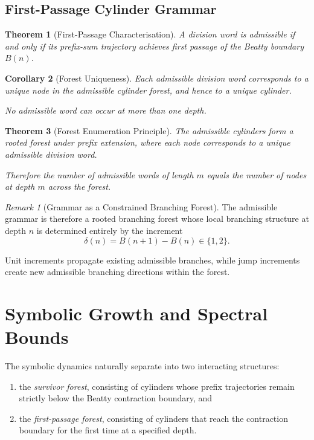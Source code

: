 \documentclass[12pt, oneside]{article}
\numberwithin{equation}{section}
\theoremstyle{definition}
\theoremstyle{plain}
\newtheorem{theorem}{Theorem}[section]
\newtheorem{corollary}[theorem]{Corollary}
\theoremstyle{remark}
\newtheorem*{remark}{Remark}
\begin{document}
\subsection{First-Passage Cylinder Grammar}

\begin{theorem}[First-Passage Characterisation]
A division word is admissible if and only if its prefix-sum trajectory
achieves first passage of the Beatty boundary \(B(n)\).
\end{theorem}

\begin{corollary}[Forest Uniqueness]
Each admissible division word corresponds to a unique node in the
admissible cylinder forest, and hence to a unique cylinder.

No admissible word can occur at more than one depth.
\end{corollary}

\begin{theorem}[Forest Enumeration Principle]
The admissible cylinders form a rooted forest under prefix extension,
where each node corresponds to a unique admissible division word.

Therefore the number of admissible words of length \(m\) equals the
number of nodes at depth \(m\) across the forest.
\end{theorem}

\begin{remark}[Grammar as a Constrained Branching Forest]
The admissible grammar is therefore a rooted branching forest whose
local branching structure at depth \(n\) is determined entirely by the
increment
\[
\delta(n)=B(n+1)-B(n)\in\{1,2\}.
\]

Unit increments propagate existing admissible branches, while jump
increments create new admissible branching directions within the forest.
\end{remark}

\section{Symbolic Growth and Spectral Bounds}
\label{sec:symbolic-growth}

The symbolic dynamics naturally separate into two interacting
structures:

\begin{enumerate}
\item the \emph{survivor forest}, consisting of cylinders whose
prefix trajectories remain strictly below the Beatty contraction
boundary, and

\item the \emph{first-passage forest}, consisting of cylinders that
reach the contraction boundary for the first time at a specified depth.
\end{enumerate}
\end{document}
